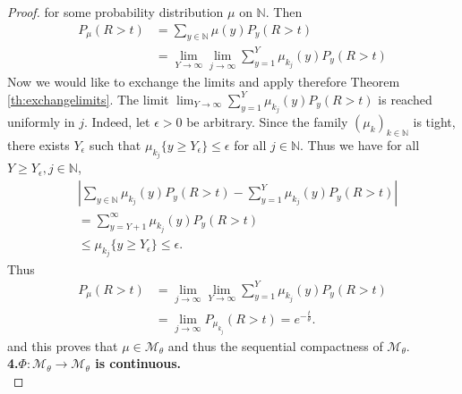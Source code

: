 \documentclass[12pt,a4paper]{scrartcl}
\numberwithin{equation}{section}
\newcommand{\N}{\mathbb{N}} %
\begin{document}
\begin{proof}
for some probability distribution $ \mu $ on $\N$. Then
\begin{align*}
P_{\mu}\left(R > t\right) &= \sum_{y \in \N} \mu\left(y\right) P_y\left(R > t\right) \\
&= \lim_{Y \to \infty} \lim_{j \to \infty} \sum_{y=1}^{Y} \mu_{k_j}\left(y\right) P_y\left(R > t\right)
\end{align*}
Now we would like to exchange the limits and apply therefore Theorem \ref{th:exchangelimits}. The limit $\lim_{Y \to \infty} \sum_{y=1}^Y \mu_{k_j}\left(y\right) P_y\left(R > t\right)$ is reached uniformly in $j$. Indeed, let $\epsilon > 0$ be arbitrary. Since the family $\left(\mu_k\right)_{k \in \N}$ is tight, there exists $Y_{\epsilon}$ such that $\mu_{k_j}\lbrace y \geq Y_{\epsilon} \rbrace  \leq \epsilon $  for all $ j \in \N$. Thus we have for all $Y \geq Y_{\epsilon}, j \in \N$,
\begin{equation} \label{eq:weshowlimitexchange}
\begin{aligned}
&\left|\sum_{y \in \N} \mu_{k_j}\left(y\right) P_y\left(R > t\right) - \sum_{y=1}^{Y} \mu_{k_j}\left(y\right) P_y\left(R > t\right) \right| \\
&=\sum_{y=Y+1}^{\infty} \mu_{k_j}\left(y\right) P_y\left(R > t\right) \\
&\leq \mu_{k_j}\lbrace y \geq Y_{\epsilon} \rbrace  \leq \epsilon.
\end{aligned} 
\end{equation}
Thus
\begin{align*}
P_{\mu}\left(R > t\right) &= \lim_{j \to \infty} \lim_{Y \to \infty} \sum_{y=1}^{Y} \mu_{k_j}\left(y\right) P_y\left(R > t\right) \\
&= \lim_{j \to \infty} P_{\mu_{k_j}}\left(R > t\right) = e^{-\frac{t}{\theta}}.
\end{align*}
and this proves that $\mu \in \mathcal{M}_{\theta}$ and thus the sequential compactness of $\mathcal{M}_{\theta}$. \\[2ex]


\textbf{4.$\Phi:\mathcal{M}_{\theta} \to \mathcal{M}_{\theta}$ is continuous.}\\



\end{proof}
\end{document}
